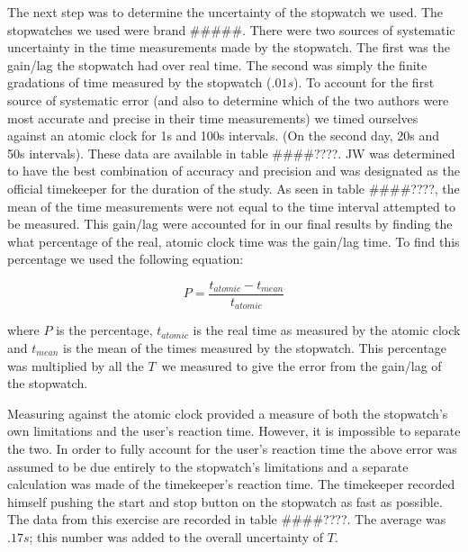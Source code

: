 \documentclass[iop,numberedappendix,appendixfloats]{emulateapj}
\def\T{$T$}
\def\fillin{\#\#\#\#????}
\begin{document}
The next step was to determine the uncertainty of the stopwatch we used.  The
stopwatches we used were brand \#\#\#\#\#.  There were two sources of systematic 
uncertainty in the time measurements made by the stopwatch.  The first was the 
gain/lag the stopwatch had over real time.  The second was simply the finite 
gradations of time measured by the stopwatch ($.01 s$).  To account for the 
first source of systematic error (and also to determine which of the two 
authors were most accurate and precise in their time measurements) we timed 
ourselves against an atomic clock for 1s and 100s intervals.  (On the second
day, 20s and 50s intervals).  These data are available in table \fillin.  JW 
was determined to have the best combination of accuracy and precision and was 
designated as the official timekeeper for the duration of the study.  As seen 
in table \fillin, the mean of the time measurements were not equal to the time 
interval attempted to be measured.  This gain/lag were accounted for in our 
final results by finding the what percentage of the real, atomic clock time 
was the gain/lag time.  To find this percentage we used the following equation:

\begin{equation}
\label{eq:timeweight}
P=\frac{t_{atomic}-t_{mean}}{t_{atomic}} 
\end{equation}

where $P$ is the percentage, $t_{atomic}$ is the real time as measured by the 
atomic clock 
and $t_{mean}$ is the mean of the times measured by the 
stopwatch.  This percentage was multiplied by all the \T\ we measured to give
the error from the gain/lag of the stopwatch.

Measuring against the atomic clock provided a measure of both the stopwatch's 
own limitations and the user's reaction time.  However, it is impossible to 
separate the two.  In order to fully account for the user's reaction time the 
above error was assumed to be due entirely to the stopwatch's limitations and 
a separate calculation was made of the timekeeper's reaction time.  The 
timekeeper recorded himself pushing the start and stop button on the stopwatch 
as fast as possible.  The data from this exercise are recorded in table \fillin. 
The average was $.17s$; this number was added to the overall uncertainty of $T$. 
\end{document}
